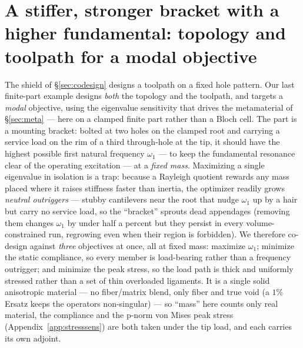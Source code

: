 \documentclass[11pt]{article}
\begin{document}
\section{A stiffer, stronger bracket with a higher fundamental: topology and toolpath
for a modal objective}
\label{sec:bracket}
The shield of \S\ref{sec:codesign} designs a toolpath on a fixed hole pattern. Our
last finite-part example designs \emph{both} the topology and the toolpath, and
targets a \emph{modal} objective, using the eigenvalue sensitivity that drives the
metamaterial of \S\ref{sec:meta} --- here on a clamped finite part rather than a Bloch
cell. The part is a mounting bracket: bolted at two holes on the clamped root and
carrying a service load on the rim of a third through-hole at the tip, it should have
the highest possible first natural frequency $\omega_1$ --- to keep the fundamental
resonance clear of the operating excitation --- at a \emph{fixed mass}. Maximizing a
single eigenvalue in isolation is a trap: because a Rayleigh quotient rewards any mass
placed where it raises stiffness faster than inertia, the optimizer readily grows
\emph{neutral outriggers} --- stubby cantilevers near the root that nudge $\omega_1$ up
by a hair but carry no service load, so the ``bracket'' sprouts dead appendages
(removing them changes $\omega_1$ by under half a percent but they persist in every
volume-constrained run, regrowing even when their region is forbidden). We therefore
co-design against \emph{three} objectives at once, all at fixed mass: maximize
$\omega_1$; minimize the static compliance, so every member is load-bearing rather than
a frequency outrigger; and minimize the peak stress, so the load path is thick and
uniformly stressed rather than a set of thin overloaded ligaments. It is a single solid
anisotropic material --- no fiber/matrix blend, only fiber and true void (a $1\%$ Ersatz
keeps the operators non-singular) --- so ``mass'' here counts only real material, the
compliance and the p-norm von Mises peak stress (Appendix~\ref{app:stresssens}) are both
taken under the tip load, and each carries its own adjoint.
\end{document}
